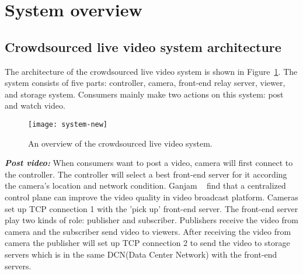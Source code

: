 
\section{System overview}
\label{sec:system}

\subsection{Crowdsourced live video system architecture}
\label{sub:system-architecture}
The architecture of the crowdsourced live video system is shown in Figure~\ref{fig:system}. The system consists of five parts: controller, camera, front-end relay server, viewer, and storage system. Consumers mainly make two actions on this system: post and watch video. 
\begin{figure}[ht]
	\centering
	\texttt{[image: system-new]}
	\caption{An overview of the crowdsourced live video system.}
	\label{fig:system} 
	\termspace
\end{figure}

\textbf{\textit{Post video:}} When consumers want to post a video, camera will first connect to the controller. The controller will select a best front-end server for it according the camera's location and network condition. Ganjam \etal~\cite{ganjam2015c3} find that a centralized control plane can improve the video quality in video broadcast platform. Cameras set up TCP connection 1 with the 'pick up' front-end server. The front-end server play two kinds of role: publisher and subscriber. Publishers receive the video from camera and the subscriber send video to viewers. After receiving the video from camera the publisher will set up TCP connection 2 to send the video to storage servers which is in the same DCN(Data Center Network) with the front-end servers. 

